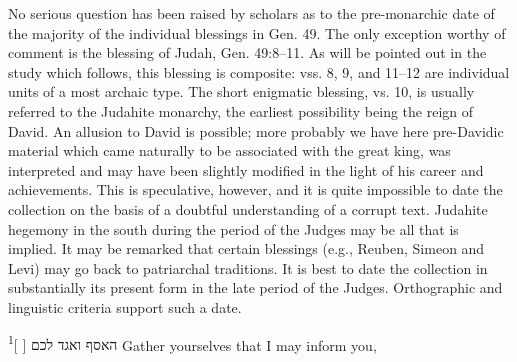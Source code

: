 {{        No serious question has been raised by scholars as to the pre-monarchic date of
        the majority of the individual blessings in Gen. 49. The only exception worthy
        of comment is the blessing of Judah, Gen. 49:8--11. As will be pointed out in
        the study which follows, this blessing is composite: vss. 8, 9, and 11--12 are
        individual units of a most archaic type. The short enigmatic blessing, vs. 10,
        is usually referred to the Judahite monarchy, the earliest possibility being
        the reign of David. An allusion to David is possible; more probably we have
        here pre-Davidic material which came naturally to be associated with the great
        king, was interpreted and may have been slightly modified in the light of his
        career and achievements. This is speculative, however, and it is quite
        impossible to date the collection on the basis of a doubtful understanding of
        a corrupt text. Judahite hegemony in the south during the period of the Judges
        may be all that is implied. It may be remarked that certain blessings (e.g.,
        Reuben, Simeon and Levi) may go back to patriarchal traditions. It is best to
        date the collection in substantially its present form in the late period of the
        Judges. Orthographic and linguistic criteria support such a date.
    }


}

{
	האסף ואגד לכם [ ]\textsuperscript{1}
}
{
	Gather yourselves that I may inform you,
}
{
}


